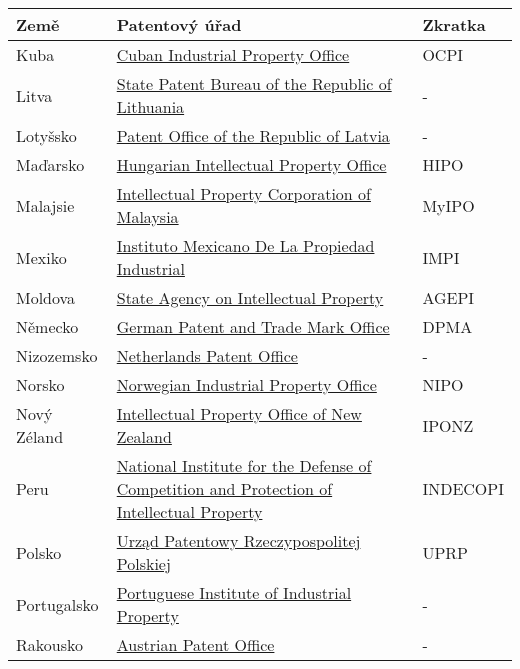 	\begin{table}[H]
	\centering
	\begin{tabular}{|>{\centering\arraybackslash}p{2.2cm}|>{\centering\arraybackslash}p{8cm}|>{\centering\arraybackslash}p{2cm}|} 
	\hline
	\textbf{Země}    & \textbf{Patentový úřad} & \textbf{Zkratka}                \\ 
	\hline
	Kuba & \href{http://www.ocpi.cu}{Cuban Industrial Property Office}  & OCPI         \\ 
	\hline
	Litva & \href{http://vpb.lrv.lt/en/}{State Patent Bureau of the Republic of Lithuania}  & -         \\
	\hline
 	Lotyšsko & \href{https://www.lrpv.gov.lv/lv}{Patent Office of the Republic of Latvia}  & -         \\ 
	\hline
	Maďarsko & \href{http://www.hipo.gov.hu/}{Hungarian Intellectual Property Office}  & HIPO         \\ 
	\hline
	Malajsie & \href{http://www.myipo.gov.my/}{Intellectual Property Corporation of Malaysia}  & MyIPO         \\ 
	\hline
	Mexiko & \href{https://www.gob.mx/impi/en}{Instituto Mexicano De La Propiedad Industrial}  & IMPI         \\ 
	\hline
	Moldova & \href{http://www.agepi.gov.md/}{State Agency on Intellectual Property}  & AGEPI         \\ 
	\hline
	Německo & \href{http://www.dpma.de/}{German Patent and Trade Mark Office}  & DPMA         \\ 
	\hline
	Nizozemsko & \href{http://www.rvo.nl/octrooien}{Netherlands Patent Office}  & -         \\ 
	\hline
	Norsko & \href{https://www.patentstyret.no/en/}{Norwegian Industrial Property Office}  & NIPO         \\ 
	\hline
	Nový Zéland & \href{http://www.iponz.govt.nz/}{Intellectual Property Office of New Zealand}  & IPONZ         \\ 
	\hline
	Peru & \href{http://www.indecopi.gob.pe/}{National Institute for the Defense of Competition and Protection of Intellectual Property}  & INDECOPI         \\ 
	\hline
	Polsko & \href{https://uprp.gov.pl/pl}{Urząd Patentowy Rzeczypospolitej Polskiej}  & UPRP         \\ 
	\hline
	Portugalsko & \href{https://inpi.justica.gov.pt/}{Portuguese Institute of Industrial Property}  & -         \\ 
	\hline
	Rakousko & \href{http://www.patentamt.at/}{Austrian Patent Office}  & -         \\ 

\end{tabular}
\end{table}
